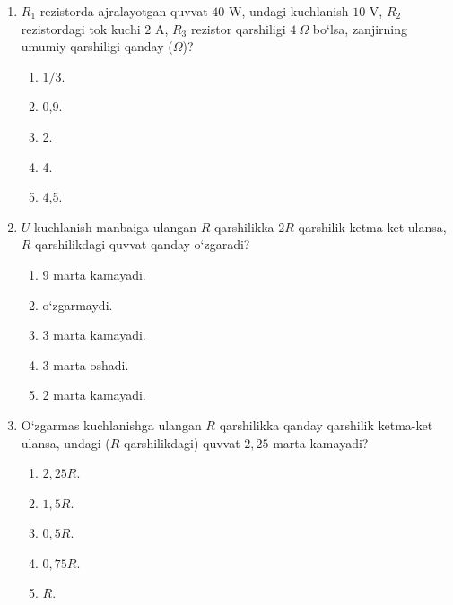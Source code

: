 \begin{enumerate}
\item $R_1$ rezistorda ajralayotgan quvvat $40$ W, undagi kuchlanish $10$ V, $R_2$ rezistordagi tok kuchi $2$ A, $R_3$ rezistor qarshiligi $4~\Omega$ bo‘lsa, zanjirning umumiy qarshiligi qanday ($\Omega$)?


\begin{enumerate}[label=\Alph*)]
\item $1/3$.
\item 0,9.
\item 2.
\item 4.
\item 4,5.
\end{enumerate}

\item $U$ kuchlanish manbaiga ulangan $R$ qarshilikka $2R$ qarshilik ketma-ket ulansa, $R$ qarshilikdagi quvvat qanday o‘zgaradi?
\begin{enumerate}[label=\Alph*)]
\item 9 marta kamayadi.
\item o‘zgarmaydi.
\item 3 marta kamayadi.
\item 3 marta oshadi.
\item 2 marta kamayadi.
\end{enumerate}

\item O‘zgarmas kuchlanishga ulangan $R$ qarshilikka qanday qarshilik ketma-ket ulansa, undagi ($R$ qarshilikdagi) quvvat $2,25$ marta kamayadi?
\begin{enumerate}[label=\Alph*)]
\item $2,25R$.
\item $1,5R$.
\item $0,5R$.
\item $0,75R$.
\item $R$.
\end{enumerate}


\end{enumerate}
